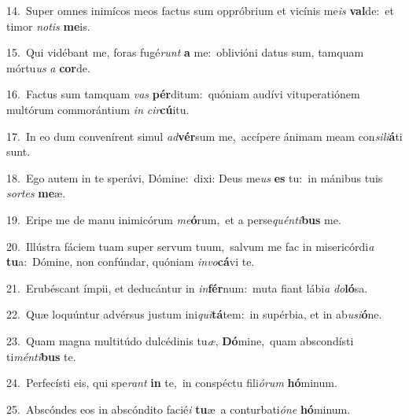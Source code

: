{\numbfont\textcolor{\numbcolor}{14.}}~Super omnes inimícos meos factus sum oppróbrium et vicínis me\textit{is} \textbf{val}\-de:~\star et timor \textit{no}\-\textit{tis} \textbf{me}\-is.\par
{\numbfont\textcolor{\numbcolor}{15.}}~Qui vidébant me, foras fugé\textit{runt} \textbf{a} me:~\star oblivióni datus sum, tamquam mórtu\textit{us} \textit{a} \textbf{cor}\-de.\par
{\numbfont\textcolor{\numbcolor}{16.}}~Factus sum tamquam \textit{vas} \textbf{pér}\-ditum:~\star quóniam audívi vituperatiónem multórum commorántium \textit{in} \textit{cir}\-\textbf{cú}itu.\par
{\numbfont\textcolor{\numbcolor}{17.}}~In eo dum convenírent simul \textit{ad}\-\textbf{vér}sum me,~\star accípere ánimam meam con\-\textit{si}\-\textit{li}\textbf{á}ti sunt.\par
{\numbfont\textcolor{\numbcolor}{18.}}~Ego autem in te sperávi, Dómine:~\dagger dixi: Deus me\textit{us} \textbf{es} tu:~\star in mánibus tuis \textit{sor}\-\textit{tes} \textbf{me}\-æ.\par
{\numbfont\textcolor{\numbcolor}{19.}}~Eripe me de manu inimicórum \textit{me}\-\textbf{ó}rum,~\star et a perse\-\textit{quén}\-\textit{ti}\textbf{bus} me.\par
{\numbfont\textcolor{\numbcolor}{20.}}~Illústra fáciem tuam super servum tuum,~\dagger salvum me fac in misericórdi\textit{a} \textbf{tu}\-a:~\star Dómine, non confúndar, quóniam \textit{in}\-\textit{vo}\textbf{cá}vi te.\par
{\numbfont\textcolor{\numbcolor}{21.}}~Erubéscant ímpii, et deducántur in \textit{in}\-\textbf{fér}num:~\star muta fiant lábi\textit{a} \textit{do}\-\textbf{ló}sa.\par
{\numbfont\textcolor{\numbcolor}{22.}}~Quæ loquúntur advérsus justum ini\-\textit{qui}\-\textbf{tá}tem:~\star in supérbia, et in ab\-\textit{u}\-\textit{si}\textbf{ó}ne.\par
{\numbfont\textcolor{\numbcolor}{23.}}~Quam magna multitúdo dulcédinis tu\-\textit{æ}\-, \textbf{Dó}\-mine,~\star quam abscondísti ti\-\textit{mén}\-\textit{ti}\textbf{bus} te.\par
{\numbfont\textcolor{\numbcolor}{24.}}~Perfecísti eis, qui spe\textit{rant} \textbf{in} te,~\star in conspéctu fili\-\textit{ó}\-\textit{rum} \textbf{hó}\-minum.\par
{\numbfont\textcolor{\numbcolor}{25.}}~Abscóndes eos in abscóndito facié\textit{i} \textbf{tu}\-æ~\star a conturbati\-\textit{ó}\-\textit{ne} \textbf{hó}\-minum.\par
